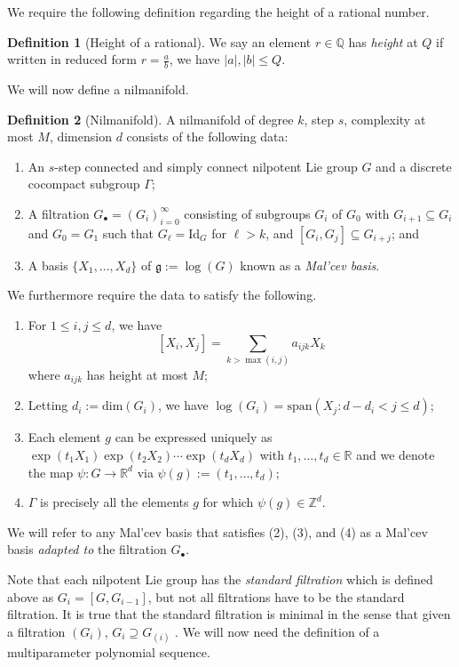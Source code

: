\documentclass[11pt, a4paper]{amsart}
\theoremstyle{plain}
\theoremstyle{plain}
\theoremstyle{definition}
\newtheorem{definition}{Definition}
\theoremstyle{remark}
\numberwithin{equation}{section}
\numberwithin{lemma}{section}
\numberwithin{proposition}{section}
\numberwithin{corollary}{section}
\numberwithin{definition}{section}
\numberwithin{claim}{section}
\begin{document}
We require the following definition regarding the height of a rational number.
\begin{definition}[Height of a rational]
We say an element $r \in \mathbb{Q}$ has \emph{height} at $Q$ if written in reduced form $r = \frac{a}{b}$, we have $|a|, |b| \le Q$.
\end{definition}
We will now define a nilmanifold.
\begin{definition}[Nilmanifold]
A nilmanifold of degree $k$, step $s$, complexity at most $M$, dimension $d$ consists of the following data:
\begin{enumerate}
    \item An $s$-step connected and simply connect nilpotent Lie group $G$ and a discrete cocompact subgroup $\Gamma$;
    \item A filtration $G_\bullet = (G_i)_{i = 0}^\infty$ consisting of subgroups $G_i$ of $G_0$ with $G_{i + 1} \subseteq G_i$ and $G_0 = G_1$ such that $G_\ell = \mathrm{Id}_G$ for $\ell > k$, and $[G_i, G_j] \subseteq G_{i + j}$; and
    \item A basis $\{X_1, \dots, X_d\}$ of $\mathfrak{g} := \log(G)$ known as a \emph{Mal'cev basis}.
\end{enumerate}
We furthermore require the data to satisfy the following.
\begin{enumerate}
    \item For $1 \le i, j \le d$, we have
    $$[X_i, X_j] = \sum_{k > \max(i, j)} a_{ijk} X_k$$
    where $a_{ijk}$ has height at most $M$;
    \item Letting $d_i := \text{dim}(G_i)$, we have $\log(G_i) = \text{span}(X_j: d - d_i < j \le d)$;
    \item Each element $g$ can be expressed uniquely as $\exp(t_1X_1)\exp(t_2X_2) \cdots \exp(t_dX_d)$ with $t_1, \dots, t_d \in \mathbb{R}$ and we denote the map $\psi\colon G \to \mathbb{R}^d$ via $\psi(g) := (t_1, \dots, t_d)$;
    \item $\Gamma$ is precisely all the elements $g$ for which $\psi(g) \in \mathbb{Z}^d$.
\end{enumerate}
We will refer to any Mal'cev basis that satisfies (2), (3), and (4) as a Mal'cev basis \emph{adapted to} the filtration $G_\bullet$.
\end{definition}
Note that each nilpotent Lie group has the \emph{standard filtration} which is defined above as $G_i = [G, G_{i - 1}]$, but not all filtrations have to be the standard filtration. It is true that the standard filtration is minimal in the sense that given a filtration $(G_i)$, $G_i \supseteq G_{(i)}$ \cite[Exercise 1.6.2]{Tao12}. We will now need the definition of a multiparameter polynomial sequence.
\end{document}
